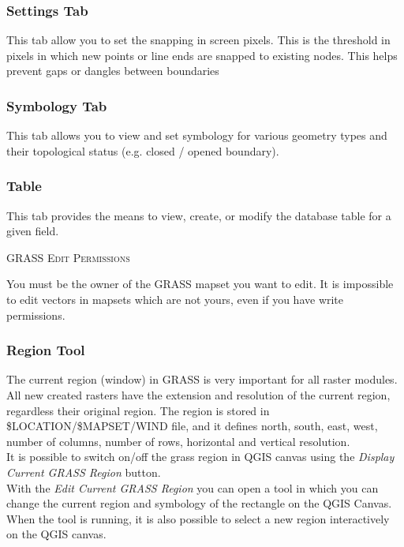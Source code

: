 \documentclass[10pt,english]{article}
\newcommand\qgistip[1]{\raggedright\small{#1}}
\begin{document}
\begin{onehalfspace}
\subsubsection{Settings Tab} 
This tab allow you to set the snapping in screen pixels. This is the threshold in pixels in which new points or line ends are snapped to existing nodes. This helps prevent gaps or dangles between boundaries

\subsubsection{Symbology Tab}
This tab allows you to view and set symbology for various geometry types and their topological status (e.g. closed / opened boundary).

\subsubsection{Table} 
This tab provides the means to view, create, or modify the database table for a given field.
\begin{Tip}\caption{\textsc{GRASS Edit Permissions}}
\qgistip{You must be the owner of the GRASS mapset you want to edit. It is impossible to edit vectors in mapsets which are not yours, even if you have write permissions.
}
\end{Tip} 

\subsubsection{Region Tool}

The current region (window) in GRASS is very important for all 
raster modules. All new created rasters have the extension and resolution
of the current region, regardless their original region. 
The region is stored in \$LOCATION/\$MAPSET/WIND file, and it defines
north, south, east, west, number of columns, number of rows, 
horizontal and vertical resolution.\\

It is possible to switch on/off the grass region in QGIS canvas
using the \textsl{Display Current GRASS Region} button.\\

With the \textsl{Edit Current GRASS Region} you can open a tool 
in which you can change the current region and symbology
of the rectangle on the QGIS Canvas. When the tool is running,
it is also possible to select a new region interactively
on the QGIS canvas.\\


\end{onehalfspace}
\end{document}

